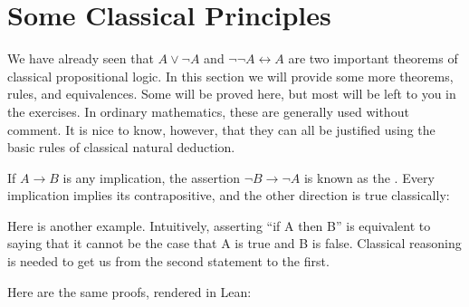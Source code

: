 \documentclass[letterpaper,10pt,english]{sphinxmanual}
\begin{document}
\section{Some Classical Principles}
\label{\detokenize{classical_reasoning:some-classical-principles}}
\sphinxAtStartPar
We have already seen that \(A \vee \neg A\) and \(\neg \neg A \leftrightarrow A\) are two important theorems of classical propositional logic. In this section we will provide some more theorems, rules, and equivalences. Some will be proved here, but most will be left to you in the exercises. In ordinary mathematics, these are generally used without comment. It is nice to know, however, that they can all be justified using the basic rules of classical natural deduction.

\sphinxAtStartPar
If \(A \to B\) is any implication, the assertion \(\neg B \to \neg A\) is known as the . Every implication implies its contrapositive, and the other direction is true classically:



\begin{center}
\AXM{}
\AXM{}
\BIM{\bot}
\DP
\end{center}

\sphinxAtStartPar
Here is another example. Intuitively, asserting “if A then B” is equivalent to saying that it cannot be the case that A is true and B is false. Classical reasoning is needed to get us from the second statement to the first.



\begin{center}
\AXM{}
\AXM{}
\AXM{}
\BIM{\bot}
\DP
\end{center}

\sphinxAtStartPar
Here are the same proofs, rendered in Lean:
\end{document}
